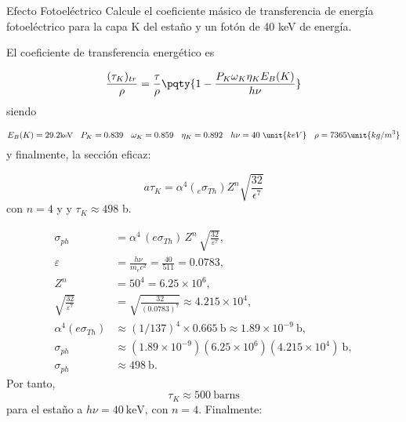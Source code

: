 \begin{Ejercicio}{Efecto Fotoeléctrico}
    Calcule el coeficiente másico de transferencia de energía fotoeléctrico para la capa K del estaño y un fotón de 40 keV de energía.
\end{Ejercicio}

El coeficiente de transferencia energético es 

\begin{equation}
    \frac{(\tau_K)_{tr}}{\rho} = \frac{\tau}{\rho} \pqty{1-\frac{P_K\omega_K\eta_K E_B(K)}{h \nu}}
\end{equation}
siendo

\begin{equation} \small
    E_B (K) = 29.2 \text{keV} \quad  P_K = 0.839 \quad \omega_K = 0.859 \quad \eta_K =0.892 \quad h \nu = 40 \ \unit{keV} \quad \rho = 7365 \unit{kg/m^3}
\end{equation}
y finalmente, la sección eficaz: 

\begin{equation}
    a\tau_K = \alpha^4 (_e \sigma_{Th}) Z^n  \sqrt{\frac{32}{\epsilon^7}}
\end{equation}
con $n=4$ y y $\tau_K \approx 498$ b. 

\begin{align} 
    \sigma_{ph} &= \alpha^4 \, (e\sigma_{Th}) \, Z^n \, \sqrt{\frac{32}{\varepsilon^7}}, \\[1ex]
    \varepsilon &= \frac{h\nu}{m_e c^2} = \frac{40}{511} = 0.0783, \\[1ex]
    Z^n &= 50^4 = 6.25 \times 10^6, \\[1ex]
    \sqrt{\frac{32}{\varepsilon^7}} &= \sqrt{\frac{32}{(0.0783)^7}} \approx 4.215 \times 10^4, \\[1ex]
    \alpha^4 (e\sigma_{Th}) &\approx (1/137)^4 \times 0.665\ \text{b} 
    \approx 1.89 \times 10^{-9}\ \text{b}, \\[1ex]
    \sigma_{ph} &\approx (1.89 \times 10^{-9})(6.25 \times 10^6)(4.215 \times 10^4)\ \text{b}, \\[1ex]
    \sigma_{ph} &\approx 498\ \text{b}.
\end{align}
Por tanto,
\[
    {\tau_K \approx 500\ \text{barns}}
\]
para el estaño a \(h\nu = 40\ \text{keV}\), con \(n=4\). Finalmente: 

